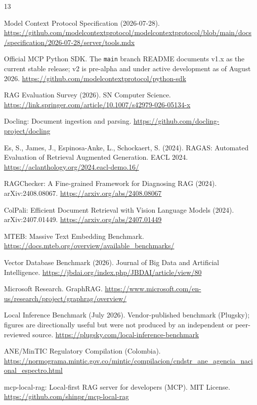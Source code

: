 \documentclass[11pt,a4paper]{article}
\begin{document}
\begin{thebibliography}{13}

Model Context Protocol Specification (2026-07-28).
\url{https://github.com/modelcontextprotocol/modelcontextprotocol/blob/main/docs/specification/2026-07-28/server/tools.mdx}

Official MCP Python SDK. The \texttt{main} branch README documents v1.x as the
current stable release; v2 is pre-alpha and under active development as of
August 2026.
\url{https://github.com/modelcontextprotocol/python-sdk}

RAG Evaluation Survey (2026). SN Computer Science.
\url{https://link.springer.com/article/10.1007/s42979-026-05134-x}

Docling: Document ingestion and parsing.
\url{https://github.com/docling-project/docling}

Es, S., James, J., Espinosa-Anke, L., Schockaert, S. (2024). RAGAS: Automated Evaluation of Retrieval Augmented Generation. EACL 2024.
\url{https://aclanthology.org/2024.eacl-demo.16/}

RAGChecker: A Fine-grained Framework for Diagnosing RAG (2024). arXiv:2408.08067.
\url{https://arxiv.org/abs/2408.08067}

ColPali: Efficient Document Retrieval with Vision Language Models (2024). arXiv:2407.01449.
\url{https://arxiv.org/abs/2407.01449}

MTEB: Massive Text Embedding Benchmark.
\url{https://docs.mteb.org/overview/available_benchmarks/}

Vector Database Benchmark (2026). Journal of Big Data and Artificial Intelligence.
\url{https://jbdai.org/index.php/JBDAI/article/view/80}

Microsoft Research. GraphRAG.
\url{https://www.microsoft.com/en-us/research/project/graphrag/overview/}

Local Inference Benchmark (July 2026). Vendor-published benchmark (Plugsky);
figures are directionally useful but were not produced by an independent or
peer-reviewed source.
\url{https://plugsky.com/local-inference-benchmark}

ANE/MinTIC Regulatory Compilation (Colombia).
\url{https://normograma.mintic.gov.co/mintic/compilacion/cndstr_ane_agencia_nacional_espectro.html}

mcp-local-rag: Local-first RAG server for developers (MCP). MIT License.
\url{https://github.com/shinpr/mcp-local-rag}

\end{thebibliography}
\end{document}
